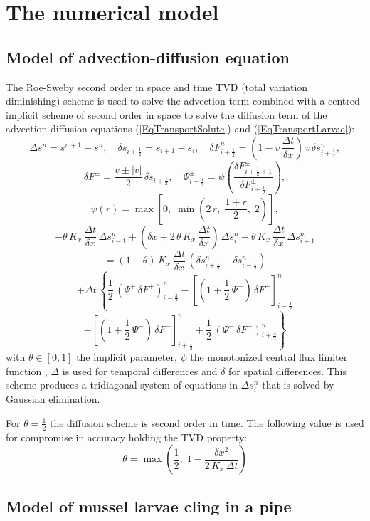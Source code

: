 \documentclass[review,authoryear]{elsarticle}
\newcommand{\CO}[1]{\left[#1\right]}
\newcommand{\EQ}[2]{\begin{equation}#1\label{#2}\end{equation}}
\newcommand{\PA}[1]{\left(#1\right)}
\begin{document}
\section{The numerical model}

\subsection{Model of advection-diffusion equation}

The Roe-Sweby \citep{Sweby84} second order in space and time TVD (total
variation diminishing) scheme is used to solve the advection term combined with
a centred implicit scheme of second order in space to solve the diffusion term
of the advection-diffusion equations (\ref{EqTransportSolute}) and
(\ref{EqTransportLarvae}):
\[\Delta s^n=s^{n+1}-s^n,\quad\delta s_{i+\frac12}=s_{i+1}-s_i,\quad
	\delta F_{i+\frac12}^n=\PA{1-v\,\frac{\Delta t}{\delta x}}\,v\,
	\delta s_{i+\frac12}^n,\]
\[
	\delta F^\pm=\frac{v\pm|v|}{2}\,\delta s_{i+\frac12},\quad
	\Psi_{i+\frac12}^\pm=\psi\PA{\frac{\delta F_{i+\frac12\pm1}^\pm}
	{\delta F_{i+\frac12}^\pm}},\]
\[\psi(r)=\max\CO{0,\;\min\PA{2\,r,\;\frac{1+r}{2},\;2}},\]
\[-\theta\,K_x\,\frac{\Delta t}{\delta x}\,\Delta s_{i-1}^n
	+\PA{\delta x+2\,\theta\,K_x\,\frac{\Delta t}{\delta x}}\,\Delta s_i^n
	-\theta\,K_x\,\frac{\Delta t}{\delta x}\,\Delta s_{i+1}^n\]
\[=(1-\theta)\,K_x\,\frac{\Delta t}{\delta x}\,\PA{\delta s_{i+\frac12}^n
	-\delta s_{i-\frac12}^n}\]
\[+\Delta t\,\left\{\frac12\,\PA{\Psi^+\,\delta F^+}_{i-\frac32}^n
	-\CO{\PA{1+\frac12\,\Psi^+}\,\delta F^+}_{i-\frac12}^n\right.\]
\EQ{
	\left.-\CO{\PA{1+\frac12\,\Psi^-}\,\delta F^-}_{i+\frac12}^n
	+\frac12\,\PA{\Psi^-\,\delta F^-}_{i+\frac32}^n\right\}}
	{EqAdvectionDiffusion}
with $\theta\in[0,1]$ the implicit parameter, $\psi$ the monotonized central
flux limiter function \citep{vanLeer77}, $\Delta$ is used for temporal
differences and $\delta$ for spatial differences. This scheme produces a
tridiagonal system of equations in $\Delta s_i^n$ that is solved by Gaussian
elimination.

For $\theta=\frac12$ the diffusion scheme is second order in time. The following
value is used for compromise in accuracy holding the TVD property:
\EQ{\theta=\max\PA{\frac12,\;1-\frac{\delta x^2}{2\,K_x\,\Delta t}}}{EqTheta}

\subsection{Model of mussel larvae cling in a pipe}
\end{document}

